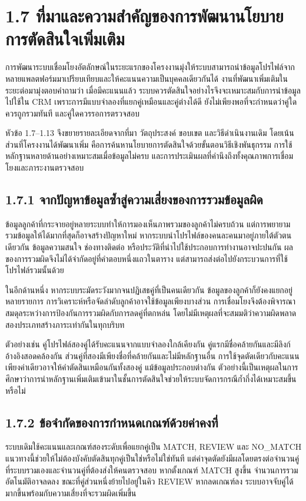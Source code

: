 \section*{1.7 ที่มาและความสำคัญของการพัฒนานโยบายการตัดสินใจเพิ่มเติม}
การพัฒนาระบบเชื่อมโยงอัตลักษณ์ในระยะแรกของโครงงานมุ่งให้ระบบสามารถนำข้อมูลโปรไฟล์จากหลายแพลตฟอร์มมาเปรียบเทียบและให้คะแนนความเป็นบุคคลเดียวกันได้ งานที่พัฒนาเพิ่มเติมในระยะต่อมามุ่งตอบคำถามว่า เมื่อมีคะแนนแล้ว ระบบควรตัดสินใจอย่างไรจึงจะเหมาะสมกับการนำข้อมูลไปใช้ใน CRM เพราะการมีแบบจำลองที่แยกคู่เหมือนและคู่ต่างได้ดี ยังไม่เพียงพอที่จะกำหนดว่าคู่ใดควรถูกรวมทันที และคู่ใดควรรอการตรวจสอบ

หัวข้อ 1.7--1.13 จึงขยายรายละเอียดจากที่มา วัตถุประสงค์ ขอบเขต และวิธีดำเนินงานเดิม โดยเน้นส่วนที่โครงงานได้พัฒนาเพิ่ม คือการค้นหานโยบายการตัดสินใจด้วยขั้นตอนวิธีเชิงพันธุกรรม การใช้หลักฐานหลายด้านอย่างเหมาะสมเมื่อข้อมูลไม่ครบ และการประเมินผลที่คำนึงถึงทั้งคุณภาพการเชื่อมโยงและภาระงานตรวจสอบ

\subsection*{1.7.1 จากปัญหาข้อมูลซ้ำสู่ความเสี่ยงของการรวมข้อมูลผิด}
ข้อมูลลูกค้าที่กระจายอยู่หลายระบบทำให้การมองเห็นภาพรวมของลูกค้าไม่ครบถ้วน แต่การพยายามรวมข้อมูลให้ได้มากที่สุดก็อาจสร้างปัญหาใหม่ หากระบบนำโปรไฟล์ของคนละคนมาอยู่ภายใต้ตัวตนเดียวกัน ข้อมูลความสนใจ ช่องทางติดต่อ หรือประวัติที่นำไปใช้ประกอบการทำงานอาจปะปนกัน ผลของการรวมผิดจึงไม่ได้จำกัดอยู่ที่คำตอบหนึ่งแถวในตาราง แต่สามารถส่งต่อไปยังกระบวนการที่ใช้โปรไฟล์รวมนั้นด้วย

ในอีกด้านหนึ่ง หากระบบระมัดระวังมากจนปฏิเสธคู่ที่เป็นคนเดียวกัน ข้อมูลของลูกค้าก็ยังคงแยกอยู่หลายรายการ การวิเคราะห์หรือจัดลำดับลูกค้าอาจใช้ข้อมูลเพียงบางส่วน การเชื่อมโยงจึงต้องพิจารณาสมดุลระหว่างการป้องกันการรวมผิดกับการลดคู่ที่ตกหล่น โดยไม่มีเหตุผลที่จะสมมติว่าความผิดพลาดสองประเภทสร้างภาระเท่ากันในทุกบริบท

ตัวอย่างเช่น คู่โปรไฟล์สองคู่ได้รับคะแนนจากแบบจำลองใกล้เคียงกัน คู่แรกมีชื่อคล้ายกันและมีลิงก์อ้างอิงสอดคล้องกัน ส่วนคู่ที่สองมีเพียงชื่อที่คล้ายกันและไม่มีหลักฐานอื่น การใช้จุดตัดเดียวกับคะแนนเพียงค่าเดียวอาจให้คำตัดสินเหมือนกันทั้งสองคู่ แม้ข้อมูลประกอบต่างกัน ตัวอย่างนี้เป็นเหตุผลในการศึกษาว่าการนำหลักฐานเพิ่มเติมเข้ามาในชั้นการตัดสินใจช่วยให้ระบบจัดการกรณีก้ำกึ่งได้เหมาะสมขึ้นหรือไม่

\subsection*{1.7.2 ข้อจำกัดของการกำหนดเกณฑ์ด้วยค่าคงที่}
ระบบเดิมใช้คะแนนและเกณฑ์สองระดับเพื่อแยกคู่เป็น MATCH, REVIEW และ NO\_MATCH แนวทางนี้ช่วยให้ไม่ต้องบังคับตัดสินทุกคู่เป็นใช่หรือไม่ใช่ทันที แต่ค่าจุดตัดยังมีผลโดยตรงต่อจำนวนคู่ที่ระบบรวมเองและจำนวนคู่ที่ต้องส่งให้คนตรวจสอบ หากตั้งเกณฑ์ MATCH สูงขึ้น จำนวนการรวมอัตโนมัติอาจลดลง ขณะที่คู่ส่วนหนึ่งย้ายไปอยู่ในคิว REVIEW หากลดเกณฑ์ลง ระบบอาจจับคู่ได้มากขึ้นพร้อมกับความเสี่ยงที่จะรวมผิดเพิ่มขึ้น

